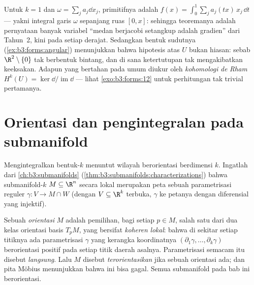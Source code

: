 \begin{remark}
Untuk $k = 1$ dan $\omega = \sum_j a_j\dd x_j$, primitifnya
adalah $f(x) = \int_0^1\sum_ja_j(tx)\,x_j\,\dd t$ --- yakni integral
garis $\omega$ sepanjang ruas $[0, x]$: sehingga teoremanya
adalah pernyataan banyak variabel ``medan berjacobi setangkup
adalah gradien'' dari Tahun~2, kini pada setiap derajat. Sedangkan bentuk
sudutnya (\cref{ex:b3:forms:angular}) menunjukkan bahwa hipotesis atas
$U$ bukan hiasan: sebab $\R^2\setminus\{0\}$ tak
berbentuk bintang, dan di sana ketertutupan tak mengakibatkan keeksakan.
Adapun yang bertahan pada  umum diukur oleh
\emph{kohomologi de Rham} $H^k(U) =
\ker\dd/\operatorname{im}\dd$ --- lihat
\cref{exo:b3:forms:12} untuk perhitungan tak trivial pertamanya.
\end{remark}

\section{Orientasi dan pengintegralan pada submanifold}

Mengintegralkan bentuk-$k$ menuntut wilayah berorientasi
berdimensi $k$. Ingatlah dari \cref{ch:b3:submanifolds}
(\cref{thm:b3:submanifolds:characterizations}) bahwa
submanifold-$k$ $M \subseteq \R^n$ secara lokal merupakan peta sebuah
parametrisasi reguler $\gamma\colon V \to M \cap W$ (dengan $V
\subseteq \R^k$ terbuka, $\gamma$  ke petanya
dengan diferensial yang injektif).

\begin{definition}\label{def:b3:forms:orientation}
Sebuah \emph{orientasi} $M$ adalah pemilihan,
bagi setiap $p \in M$, salah satu dari dua kelas orientasi
basis  $T_pM$, yang bersifat \emph{koheren
lokal}: bahwa di sekitar setiap titiknya ada parametrisasi
$\gamma$ yang kerangka koordinatnya $(\partial_1\gamma, \dots,
\partial_k\gamma)$ berorientasi positif pada setiap titik
daerah asalnya. Parametrisasi semacam itu disebut \emph{langsung}.
Lalu $M$ disebut \emph{terorientasikan} jika sebuah orientasi ada; dan
pita Möbius menunjukkan bahwa ini bisa gagal. Semua submanifold pada bab
ini berorientasi.
\end{definition}


